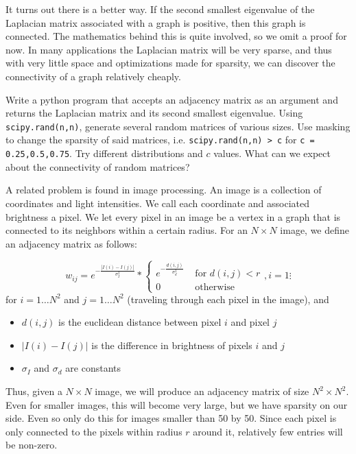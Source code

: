 It turns out there is a better way.
If the second smallest eigenvalue of the Laplacian matrix associated with a graph is positive, then this graph is connected.
The mathematics behind this is quite involved, so we omit a proof for now.
In many applications the Laplacian matrix will be very sparse, and thus with very little space and optimizations made for sparsity, we can discover the connectivity of a graph relatively cheaply.

\begin{problem}Write a python program that accepts an adjacency matrix as an argument and returns the Laplacian matrix and its second smallest eigenvalue.
Using {\tt scipy.rand(n,n)}, generate several random matrices of various sizes.
Use masking to change the sparsity of said matrices, i.e. {\tt scipy.rand(n,n) > c} for {\tt c = 0.25,0.5,0.75}.
Try different distributions and $c$ values.
What can we expect about the connectivity of random matrices?
\end{problem}

A related problem is found in image processing.
An image is a collection of coordinates and light intensities.
We call each coordinate and associated brightness a pixel.
We let every pixel in an image be a vertex in a graph that is connected to its neighbors within a certain radius.
For an $N \times N$ image, we define an adjacency matrix as follows:

\begin{equation}
\label{eq:adjacency}
w_{ij} = e^{-\frac{|I(i) - I(j)|}{\sigma_I^2}} * \begin{cases} e^{-\frac{d(i,j)}{\sigma_d^2}} & \mbox{ for $d(i,j) < r$} \\ 0 & \mbox{ otherwise} \end{cases}, i = 1 \vdots
\end{equation}
for $i = 1 \hdots N^2$ and $j = 1 \hdots N^2$ (traveling through each pixel in the image), and 
\begin{itemize}
	\item$d(i,j)$ is the euclidean distance between pixel $i$ and pixel $j$ 
	\item $|I(i) - I(j)|$ is the difference in brightness of pixels $i$ and $j$
	\item $\sigma_I$ and $\sigma_d$ are constants
\end{itemize} 
Thus, given a $N\times N$ image, we will produce an adjacency matrix of size $N^2\times N^2$.
Even for smaller images, this will become very large, but we have sparsity on our side.
Even so only do this for images smaller than 50 by 50.
Since each pixel is only connected to the pixels within radius $r$ around it, relatively few entries will be non-zero.

